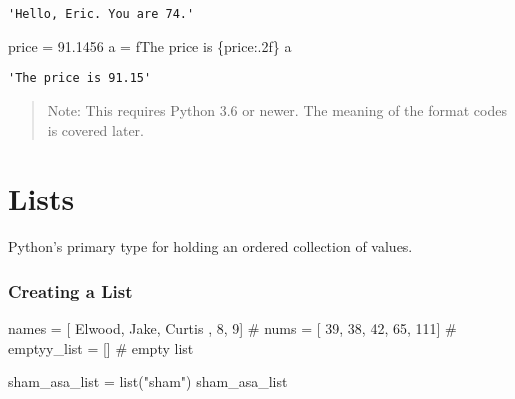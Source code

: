 \documentclass[
  letterpaper,
  DIV=11,
  numbers=noendperiod]{scrreprt}
\newenvironment{Shaded}{\begin{snugshade}}{\end{snugshade}}
\newcommand{\BuiltInTok}[1]{\textcolor[rgb]{0.00,0.46,0.62}{#1}}
\newcommand{\CommentTok}[1]{\textcolor[rgb]{0.37,0.37,0.37}{#1}}
\newcommand{\DecValTok}[1]{\textcolor[rgb]{0.68,0.00,0.00}{#1}}
\newcommand{\FloatTok}[1]{\textcolor[rgb]{0.68,0.00,0.00}{#1}}
\newcommand{\NormalTok}[1]{\textcolor[rgb]{0.00,0.46,0.62}{#1}}
\newcommand{\OperatorTok}[1]{\textcolor[rgb]{0.37,0.37,0.37}{#1}}
\newcommand{\SpecialCharTok}[1]{\textcolor[rgb]{0.37,0.37,0.37}{#1}}
\newcommand{\SpecialStringTok}[1]{\textcolor[rgb]{0.13,0.47,0.30}{#1}}
\newcommand{\StringTok}[1]{\textcolor[rgb]{0.13,0.47,0.30}{#1}}
\begin{document}
\begin{verbatim}
'Hello, Eric. You are 74.'
\end{verbatim}

\begin{Shaded}
\begin{Highlighting}[]
\NormalTok{price }\OperatorTok{=} \FloatTok{91.1456}
\NormalTok{a }\OperatorTok{=} \SpecialStringTok{f\textquotesingle{}The price is }\SpecialCharTok{\{}\NormalTok{price}\SpecialCharTok{:.2f\}}\SpecialStringTok{\textquotesingle{}}
\NormalTok{a}
\end{Highlighting}
\end{Shaded}

\begin{verbatim}
'The price is 91.15'
\end{verbatim}

\begin{quote}
Note: This requires Python 3.6 or newer. The meaning of the format codes
is covered later.
\end{quote}

\hypertarget{lists}{%
\section{Lists}\label{lists}}

Python's primary type for holding an ordered collection of values.

\hypertarget{creating-a-list}{%
\subsubsection{Creating a List}\label{creating-a-list}}

\begin{Shaded}
\begin{Highlighting}[]
\NormalTok{names }\OperatorTok{=}\NormalTok{ [ }\StringTok{\textquotesingle{}Elwood\textquotesingle{}}\NormalTok{, }\StringTok{\textquotesingle{}Jake\textquotesingle{}}\NormalTok{, }\StringTok{\textquotesingle{}Curtis\textquotesingle{}}\NormalTok{ , }\DecValTok{8}\NormalTok{, }\DecValTok{9}\NormalTok{]}
\CommentTok{\# nums = [ 39, 38, 42, 65, 111]}
\CommentTok{\# emptyy\_list = [] \# empty list}
\end{Highlighting}
\end{Shaded}

\begin{Shaded}
\begin{Highlighting}[]
\NormalTok{sham\_asa\_list }\OperatorTok{=} \BuiltInTok{list}\NormalTok{(}\StringTok{"sham"}\NormalTok{)}
\NormalTok{sham\_asa\_list }
\end{Highlighting}
\end{Shaded}
\end{document}
